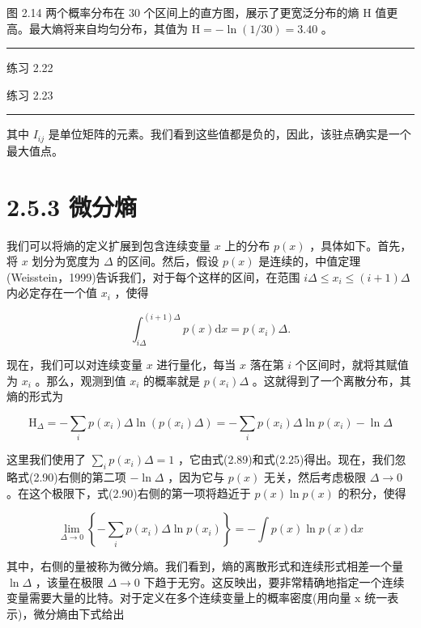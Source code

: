 \documentclass[10pt]{article}
\newcommand{\HRule}{\begin{center}\rule{0.9\linewidth}{0.2mm}\end{center}}
\begin{document}
图 2.14 两个概率分布在 30 个区间上的直方图，展示了更宽泛分布的熵 \(\mathrm{H}\) 值更高。最大熵将来自均匀分布，其值为 \(\mathrm{H} =  - \ln \left( {1/{30}}\right)  = {3.40}\) 。

\HRule

练习 2.22

练习 2.23

\HRule

其中 \({I}_{ij}\) 是单位矩阵的元素。我们看到这些值都是负的，因此，该驻点确实是一个最大值点。

\section*{2.5.3 微分熵}

我们可以将熵的定义扩展到包含连续变量 \(x\) 上的分布 \(p\left( x\right)\) ，具体如下。首先，将 \(x\) 划分为宽度为 \(\Delta\) 的区间。然后，假设 \(p\left( x\right)\) 是连续的，中值定理(Weisstein，1999)告诉我们，对于每个这样的区间，在范围 \({i\Delta } \leq  {x}_{i} \leq  \left( {i + 1}\right) \Delta\) 内必定存在一个值 \({x}_{i}\) ，使得

\[
{\int }_{i\Delta }^{\left( {i + 1}\right) \Delta }p\left( x\right) \mathrm{d}x = p\left( {x}_{i}\right) \Delta . \tag{2.89}
\]

现在，我们可以对连续变量 \(x\) 进行量化，每当 \(x\) 落在第 \(i\) 个区间时，就将其赋值为 \({x}_{i}\) 。那么，观测到值 \({x}_{i}\) 的概率就是 \(p\left( {x}_{i}\right) \Delta\) 。这就得到了一个离散分布，其熵的形式为

\[
{\mathrm{H}}_{\Delta } =  - \mathop{\sum }\limits_{i}p\left( {x}_{i}\right) \Delta \ln \left( {p\left( {x}_{i}\right) \Delta }\right)  =  - \mathop{\sum }\limits_{i}p\left( {x}_{i}\right) \Delta \ln p\left( {x}_{i}\right)  - \ln \Delta  \tag{2.90}
\]

这里我们使用了 \(\mathop{\sum }\limits_{i}p\left( {x}_{i}\right) \Delta  = 1\) ，它由式(2.89)和式(2.25)得出。现在，我们忽略式(2.90)右侧的第二项 \(- \ln \Delta\) ，因为它与 \(p\left( x\right)\) 无关，然后考虑极限 \(\Delta  \rightarrow  0\) 。在这个极限下，式(2.90)右侧的第一项将趋近于 \(p\left( x\right) \ln p\left( x\right)\) 的积分，使得

\[
\mathop{\lim }\limits_{{\Delta  \rightarrow  0}}\left\{  {-\mathop{\sum }\limits_{i}p\left( {x}_{i}\right) \Delta \ln p\left( {x}_{i}\right) }\right\}   =  - \int p\left( x\right) \ln p\left( x\right) \mathrm{d}x \tag{2.91}
\]

其中，右侧的量被称为微分熵。我们看到，熵的离散形式和连续形式相差一个量 \(\ln \Delta\) ，该量在极限 \(\Delta  \rightarrow  0\) 下趋于无穷。这反映出，要非常精确地指定一个连续变量需要大量的比特。对于定义在多个连续变量上的概率密度(用向量 \(\mathrm{x}\) 统一表示)，微分熵由下式给出
\end{document}
